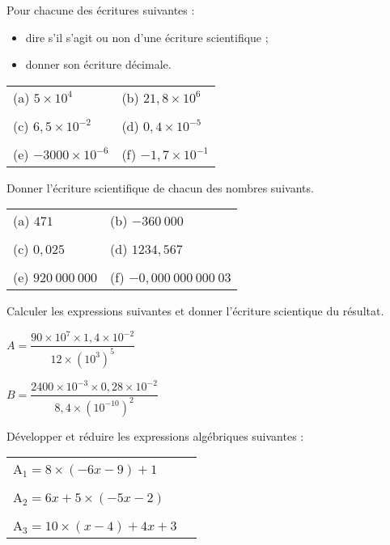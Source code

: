 \medskip
\begin{exercice}[]
Pour chacune des écritures suivantes :
\begin{itemize}
\item dire s'il s'agit ou non d'une écriture scientifique ;
\item donner son écriture décimale.
\end{itemize}

\renewcommand{\arraystretch}{0.8}
\begin{tabular}{p{4cm}p{4cm}}
(a) $5 \times 10^4$ & (b) $21,8 \times 10^6$\\
&\\
(c) $6,5 \times 10^{-2}$ & (d) $0,4 \times 10^{-5}$\\
&\\
(e) $-3 000 \times 10^{-6}$ & (f) $-1,7 \times 10^{-1}$\\
\end{tabular}
\end{exercice}
\medskip
\begin{exercice}[]
Donner l'écriture scientifique de chacun des nombres suivants.

\renewcommand{\arraystretch}{0.8}
\begin{tabular}{p{4cm}p{4cm}}
(a) $471$ & (b) $-360~000$\\
&\\
(c) $0,025$ & (d) $1234,567$\\
&\\
(e) $920~000~000$ & (f) $-0,000~000~000~03$\\
\end{tabular}
\end{exercice}
\medskip
\begin{exercice}[]
Calculer les expressions suivantes et donner l'écriture scientique du résultat.
\begin{description}
\item $A=\dfrac{90 \times 10^7 \times 1,4 \times10^{-2}}{12 \times (10^3)^5}$\\
\item $B=\dfrac{2400 \times 10^{-3} \times 0,28 \times10^{-2}}{8,4 \times (10^{-10})^2}$
\end{description}
\end{exercice}

\newpage


\begin{exercice}[]
Développer et réduire les expressions algébriques suivantes :

\begin{tabular}{m{4.75cm}m{2.75cm}}
{A$_1=8 \times (-6x-9)+1$} \\
&\\
{A$_2=6x+5 \times (-5x-2)$}\\
&\\
{A$_3=10 \times (x-4)+4x+3$}\\
\end{tabular}
\end{exercice}

